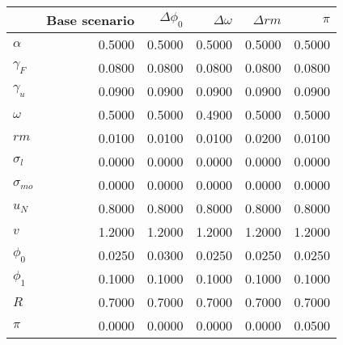 \begin{tabular}{lrrrrr}
\toprule
{} &  Base scenario &  $\Delta \phi_0$ &  $\Delta \omega$ &  $\Delta rm$ &  $\pi$ \\
\midrule
$\alpha$      &         0.5000 &           0.5000 &           0.5000 &       0.5000 & 0.5000 \\
$\gamma_F$    &         0.0800 &           0.0800 &           0.0800 &       0.0800 & 0.0800 \\
$\gamma_u$    &         0.0900 &           0.0900 &           0.0900 &       0.0900 & 0.0900 \\
$\omega$      &         0.5000 &           0.5000 &           0.4900 &       0.5000 & 0.5000 \\
$rm$          &         0.0100 &           0.0100 &           0.0100 &       0.0200 & 0.0100 \\
$\sigma_{l}$  &         0.0000 &           0.0000 &           0.0000 &       0.0000 & 0.0000 \\
$\sigma_{mo}$ &         0.0000 &           0.0000 &           0.0000 &       0.0000 & 0.0000 \\
$u_N$         &         0.8000 &           0.8000 &           0.8000 &       0.8000 & 0.8000 \\
$v$           &         1.2000 &           1.2000 &           1.2000 &       1.2000 & 1.2000 \\
$\phi_0$      &         0.0250 &           0.0300 &           0.0250 &       0.0250 & 0.0250 \\
$\phi_1$      &         0.1000 &           0.1000 &           0.1000 &       0.1000 & 0.1000 \\
$R$           &         0.7000 &           0.7000 &           0.7000 &       0.7000 & 0.7000 \\
$\pi$         &         0.0000 &           0.0000 &           0.0000 &       0.0000 & 0.0500 \\
\bottomrule
\end{tabular}
